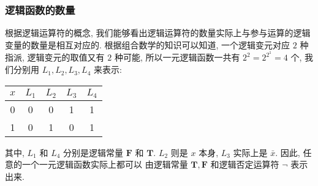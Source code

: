 \documentclass[10pt,UTF8]{book} %
\begin{document}


\subsubsection{逻辑函数的数量}

根据逻辑运算符的概念, 我们能够看出逻辑运算符的数量实际上与参与运算的逻辑变量的数量是相互对应的.
根据组合数学的知识可以知道, 一个逻辑变元对应 $2$ 种指派, 逻辑变元的取值又有 $2$ 种可能,
所以一元逻辑函数一共有 $2^2 = 2^{2^1}= 4$ 个, 我们分别用 $L_1, L_2, L_3, L_4$ 来表示:
{ %
\label{一元逻辑函数} %
\begin{longtable}{c|cccc}
    \toprule
    $x$ & $L_1$ & $L_2$ & $L_3$ & $L_4$ \\
    \midrule
    \endhead
    \bottomrule
    \endfoot

    0 & 0 & 0 & 1 & 1 \\
    1 & 0 & 1 & 0 & 1 \\
\end{longtable}}
其中, $L_1$ 和 $L_4$ 分别是逻辑常量 $\mathbf{F}$ 和 $\mathbf{T}$.
$L_2$ 则是 $x$ 本身, $L_3$ 实际上是 $\bar x$. 因此, 任意的一个一元逻辑函数实际上都可以
由逻辑常量 $\mathbf{T}, \mathbf{F}$ 和逻辑否定运算符 $\lnot$ 表示出来.
\end{document}
